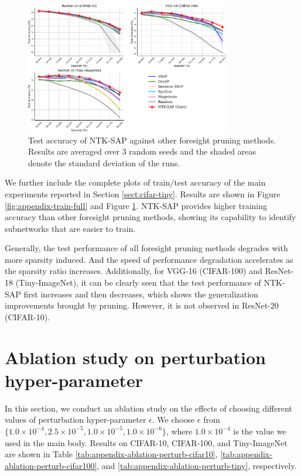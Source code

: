 \documentclass{article} %
\begin{document}
\begin{figure}
  \centering
    \includegraphics[width=0.8\textwidth]{plots/appendix-test-full.pdf}
   \caption{Test accuracy of NTK-SAP against other foresight pruning methods. Results are averaged over 3 random seeds and the shaded areas denote the standard deviation of the runs.}
   \label{fig:appendix-test-full}
\end{figure}
We further include the complete plots of train/test accuracy of the main experiments reported in Section \ref{sect:cifar-tiny}. Results are shown in Figure \ref{fig:appendix-train-full} and Figure \ref{fig:appendix-test-full}. NTK-SAP provides higher training accuracy than other foresight pruning methods, showing its capability to identify  subnetworks that are easier to train. 

Generally, the test performance of all foresight pruning methods degrades with more sparsity induced. And the speed of performance degradation accelerates as the sparsity ratio increases. Additionally, for VGG-16 (CIFAR-100) and ResNet-18 (Tiny-ImageNet), it can be clearly seen that the test performance of NTK-SAP first increases and then decreases, which shows the generalization improvements brought by pruning. However, it is not observed in ResNet-20 (CIFAR-10).

\section{Ablation study on perturbation hyper-parameter} \label{sect:ablation-epsilon}
In this section, we conduct an ablation study on the effects of choosing different values of perturbation hyper-parameter $\epsilon$. We choose $\epsilon$ from $\{1.0 \times 10^{-4}, 2.5 \times 10^{-5}, 1.0 \times 10^{-5}, 1.0 \times 10^{-6}\}$, where $1.0 \times 10^{-4}$ is the value we used in the main body. Results on CIFAR-10, CIFAR-100, and Tiny-ImageNet are shown in Table \ref{tab:appendix-ablation-perturb-cifar10}, \ref{tab:appendix-ablation-perturb-cifar100}, and \ref{tab:appendix-ablation-perturb-tiny}, respectively. 
\end{document}
